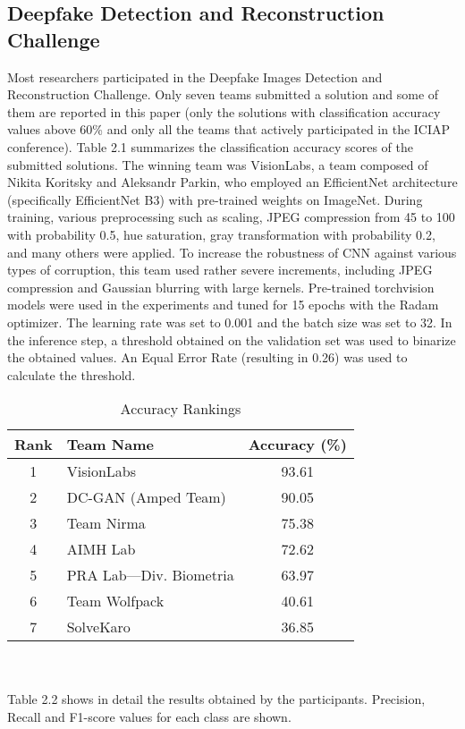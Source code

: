 \subsection{Deepfake Detection and Reconstruction Challenge}
Most researchers participated in the Deepfake Images Detection and Reconstruction
Challenge. Only seven teams submitted a solution and some of them are reported
in this paper (only the solutions with classification accuracy values above 60\% and only
all the teams that actively participated in the ICIAP conference). Table 2.1 summarizes the
classification accuracy scores of the submitted solutions. The winning team
was VisionLabs, a team composed of Nikita Koritsky and Aleksandr Parkin, who employed
an EfficientNet architecture \cite{pmlr-v97-tan19a} (specifically EfficientNet B3) with pre-trained weights on
ImageNet. During training, various preprocessing such as scaling, JPEG compression from
45 to 100 with probability 0.5, hue saturation, gray transformation with probability 0.2,
and many others were applied. To increase the robustness of CNN against various types
of corruption, this team used rather severe increments, including JPEG compression and
Gaussian blurring with large kernels. Pre-trained torchvision models were used in the
experiments and tuned for 15 epochs with the Radam optimizer\cite{liu2021variance}. The learning rate was
set to 0.001 and the batch size was set to 32. In the inference step, a threshold obtained on
the validation set was used to binarize the obtained values. An Equal Error Rate (resulting
in 0.26) was used to calculate the threshold. \cite{jimaging8100263}
\vspace{1cm}
\begin{table}[ht]
\centering
\begin{tabular}{|c|l|c|}
\hline
\textbf{Rank} & \textbf{Team Name} & \textbf{Accuracy (\%)} \\
\hline
1 & VisionLabs & 93.61 \\
2 & DC-GAN (Amped Team) & 90.05 \\
3 & Team Nirma & 75.38 \\
4 & AIMH Lab & 72.62 \\
5 & PRA Lab—Div. Biometria & 63.97 \\
6 & Team Wolfpack & 40.61 \\
7 & SolveKaro & 36.85 \\
\hline
\end{tabular}
\caption{Accuracy Rankings}
\label{tab:accuracy-rankings}
\end{table} \\\\
Table 2.2 shows in detail the results obtained by the participants.
Precision, Recall and F1-score values for each class are shown.

